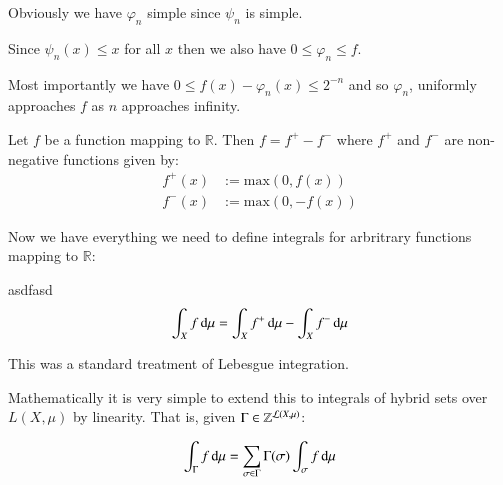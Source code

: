 Obviously we have $\varphi_n$ simple since $\psi_n$ is simple. 

Since $\psi_n(x) \leq x$ for all $x$ then we also have $0 \leq \varphi_n \leq f$.

Most importantly we have $0 \leq f(x) - \varphi_n(x) \leq 2^{-n}$ and so $\varphi_n$, uniformly approaches $f$ as $n$ approaches infinity. 

\begin{theorem}
Let $f$ be a function mapping to $\mathbb{R}$. Then $f = f^+ - f^-$ where $f^+$ and $f^-$ are non-negative functions given by:
\begin{align}
f^+(x) &:= \mathrm{max}( 0, f(x)) \\
f^-(x) &:= \mathrm{max}(0, -f(x)) 
\end{align}
\end{theorem}

Now we have everything we need to define integrals for arbritrary functions mapping to $\mathbb{R}$:

\begin{definition}
asdfasd
\begin{equation}
\int_X f \mathop{}\!\mathrm{d} \mu = \int_X f^+ \mathop{}\!\mathrm{d} \mu - \int_X f^- \mathop{}\!\mathrm{d} \mu
\end{equation}
\end{definition}



This was a standard treatment of Lebesgue integration.

Mathematically it is very simple to extend this to integrals of hybrid sets over $L(X, \mu)$ by linearity.
That is, given $\Gamma \in \hsetover[\mathcal{L}(X,\mu)]$:

\begin{equation}
\int_\Gamma f \mathop{}\!\mathrm{d} \mu = \sum_{\sigma \in \Gamma} \Gamma(\sigma) \int_\sigma f \mathop{}\!\mathrm{d}\mu
\end{equation}

